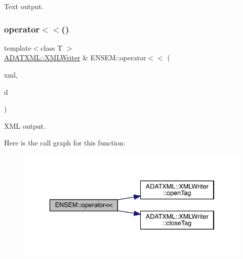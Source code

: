 Text output. 

\mbox{\label{group__primseed_ga439f61b77175a57d5c91c25e0eda2733}} 
\subsubsection{\texorpdfstring{operator$<$$<$()}{operator<<()}\hspace{0.1cm}{\footnotesize\ttfamily [3/4]}}
{\footnotesize\ttfamily template$<$class T $>$ \\
\mbox{\hyperlink{classADATXML_1_1XMLWriter}{A\+D\+A\+T\+X\+M\+L\+::\+X\+M\+L\+Writer}} \& E\+N\+S\+E\+M\+::operator$<$$<$ (\begin{DoxyParamCaption}\item[{\mbox{\hyperlink{classADATXML_1_1XMLWriter}{A\+D\+A\+T\+X\+M\+L\+::\+X\+M\+L\+Writer}} \&}]{xml,  }\item[{const \mbox{\hyperlink{classENSEM_1_1PSeed}{P\+Seed}}$<$ T $>$ \&}]{d }\end{DoxyParamCaption})\hspace{0.3cm}{\ttfamily [inline]}}



X\+ML output. 

Here is the call graph for this function\+:\nopagebreak
\begin{figure}[H]
\begin{center}
\leavevmode
\includegraphics[width=336pt]{df/d3c/group__primseed_ga439f61b77175a57d5c91c25e0eda2733_cgraph}
\end{center}
\end{figure}
\mbox{\label{group__primseed_ga2c9462b410a1897e81847c2ca630c0fd}} 
